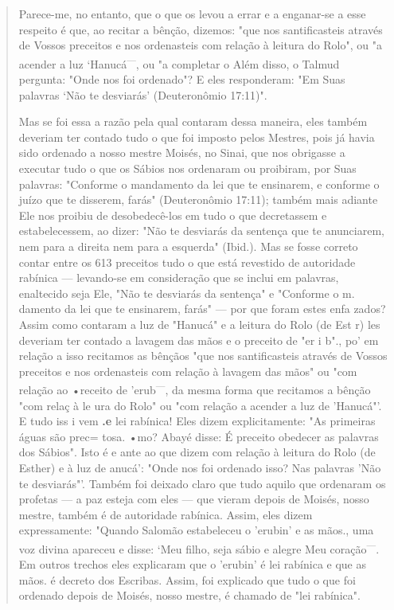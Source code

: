 \begin{quote}
Parece-me, no entanto, que o que os levou a errar e a enganar-se a esse
respeito é que, ao recitar a bênção, dizemos: "que nos santificasteis
atra­vés de Vossos preceitos e nos ordenasteis com relação à leitura do
Rolo", ou "a acender a luz `Hanucá\textsuperscript{---}, ou "a completar
o Além disso, o Talmud pergunta: "Onde nos foi ordenado"? E eles
responderam: "Em Suas palavras `Não te desviarás' (Deuteronômio 17:11)".

Mas se foi essa a razão pela qual contaram dessa maneira, eles tam­bém
deveriam ter contado tudo o que foi imposto pelos Mestres, pois já havia
sido ordenado a nosso mestre Moisés, no Sinai, que nos obrigasse a
executar tudo o que os Sábios nos ordenaram ou proibiram, por Suas
palavras: "Confor­me o mandamento da lei que te ensinarem, e conforme o
juízo que te disse­rem, farás" (Deuteronômio 17:11); também mais adiante
Ele nos proibiu de desobedecê-los em tudo o que decretassem e
estabelecessem, ao dizer: "Não te desviarás da sentença que te
anunciarem, nem para a direita nem para a es­querda" (Ibid.). Mas se
fosse correto contar entre os 613 preceitos tudo o que está revestido de
autoridade rabínica --- levando-se em consideração que se in­clui em
palavras, enaltecido seja Ele, "Não te desviarás da sentença" e
"Con­forme o m. damento da lei que te ensinarem, farás" --- por que
foram estes enfa zados? Assim como contaram a luz de "Hanucá" e a
leitura do Rolo (de Est r) les deveriam ter contado a lavagem das mãos e
o preceito de "er i b"., po' em relação a isso
recitamos as bênçãos "que nos santificasteis
através de Vossos preceitos e nos ordenasteis com relação à lavagem das
mãos" ou "com relação ao •receito de 'erub\textsuperscript{---}, da
mesma forma que recitamos a bên­ção "com relaç à le ura do Rolo" ou "com
relação a acender a luz de 'Hanu­cá"'. E tudo iss i vem
\textbf{.e} lei rabínica! Eles dizem explicitamente:
"As primeiras águas são prec= tosa. •mo? Abayé disse: É preceito
obedecer as palavras dos Sábios". Isto é e ante ao que dizem com relação
à leitura do Rolo (de Es­ther) e à luz de anucá': "Onde nos foi ordenado
isso? Nas palavras 'Não te desviarás"'. Também foi deixado claro que
tudo aquilo que ordenaram os pro­fetas --- a paz esteja com eles --- que
vieram depois de Moisés, nosso mestre, também é de autoridade rabínica.
Assim, eles dizem expressamente: "Quando Salomão estabeleceu o 'erubin'
e as mãos., uma voz divina apareceu e disse: `Meu
filho, seja sábio e alegre Meu coração\textsuperscript{---}. Em outros
trechos eles explica­ram que o 'erubin' é lei rabínica e que as
mãos. é decreto dos Escribas. Assim, foi explicado que
tudo o que foi ordenado depois de Moisés, nosso mestre, é chamado de
"lei rabínica".


\end{quote}
